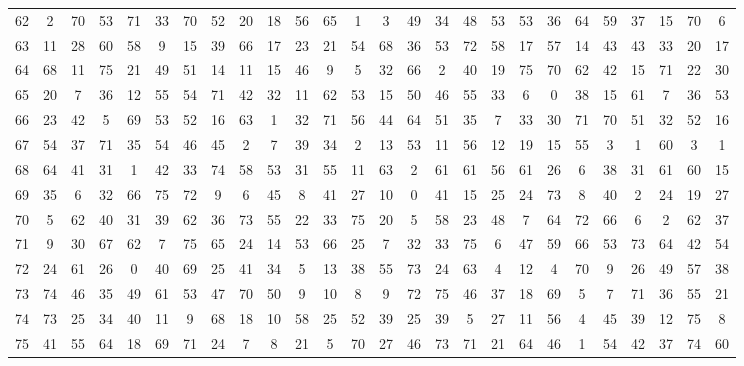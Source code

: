 \begin{table}
\begin{tabular}{c c c c c c c c c c c c c c c c c c c c c c c c c c }
62 & 2 & 70 & 53 & 71 & 33 & 70 & 52 & 20 & 18 & 56 & 65 & 1 & 3 & 49 & 34 & 48 & 53 & 53 & 36 & 64 & 59 & 37 & 15 & 70 & 6 \\
63 & 11 & 28 & 60 & 58 & 9 & 15 & 39 & 66 & 17 & 23 & 21 & 54 & 68 & 36 & 53 & 72 & 58 & 17 & 57 & 14 & 43 & 43 & 33 & 20 & 17 \\
64 & 68 & 11 & 75 & 21 & 49 & 51 & 14 & 11 & 15 & 46 & 9 & 5 & 32 & 66 & 2 & 40 & 19 & 75 & 70 & 62 & 42 & 15 & 71 & 22 & 30 \\
65 & 20 & 7 & 36 & 12 & 55 & 54 & 71 & 42 & 32 & 11 & 62 & 53 & 15 & 50 & 46 & 55 & 33 & 6 & 0 & 38 & 15 & 61 & 7 & 36 & 53 \\
66 & 23 & 42 & 5 & 69 & 53 & 52 & 16 & 63 & 1 & 32 & 71 & 56 & 44 & 64 & 51 & 35 & 7 & 33 & 30 & 71 & 70 & 51 & 32 & 52 & 16 \\
67 & 54 & 37 & 71 & 35 & 54 & 46 & 45 & 2 & 7 & 39 & 34 & 2 & 13 & 53 & 11 & 56 & 12 & 19 & 15 & 55 & 3 & 1 & 60 & 3 & 1 \\
68 & 64 & 41 & 31 & 1 & 42 & 33 & 74 & 58 & 53 & 31 & 55 & 11 & 63 & 2 & 61 & 61 & 56 & 61 & 26 & 6 & 38 & 31 & 61 & 60 & 15 \\
69 & 35 & 6 & 32 & 66 & 75 & 72 & 9 & 6 & 45 & 8 & 41 & 27 & 10 & 0 & 41 & 15 & 25 & 24 & 73 & 8 & 40 & 2 & 24 & 19 & 27 \\
70 & 5 & 62 & 40 & 31 & 39 & 62 & 36 & 73 & 55 & 22 & 33 & 75 & 20 & 5 & 58 & 23 & 48 & 7 & 64 & 72 & 66 & 6 & 2 & 62 & 37 \\
71 & 9 & 30 & 67 & 62 & 7 & 75 & 65 & 24 & 14 & 53 & 66 & 25 & 7 & 32 & 33 & 75 & 6 & 47 & 59 & 66 & 53 & 73 & 64 & 42 & 54 \\
72 & 24 & 61 & 26 & 0 & 40 & 69 & 25 & 41 & 34 & 5 & 13 & 38 & 55 & 73 & 24 & 63 & 4 & 12 & 4 & 70 & 9 & 26 & 49 & 57 & 38 \\
73 & 74 & 46 & 35 & 49 & 61 & 53 & 47 & 70 & 50 & 9 & 10 & 8 & 9 & 72 & 75 & 46 & 37 & 18 & 69 & 5 & 7 & 71 & 36 & 55 & 21 \\
74 & 73 & 25 & 34 & 40 & 11 & 9 & 68 & 18 & 10 & 58 & 25 & 52 & 39 & 25 & 39 & 5 & 27 & 11 & 56 & 4 & 45 & 39 & 12 & 75 & 8 \\
75 & 41 & 55 & 64 & 18 & 69 & 71 & 24 & 7 & 8 & 21 & 5 & 70 & 27 & 46 & 73 & 71 & 21 & 64 & 46 & 1 & 54 & 42 & 37 & 74 & 60 \\
\hline
\end{tabular}
\end{table}